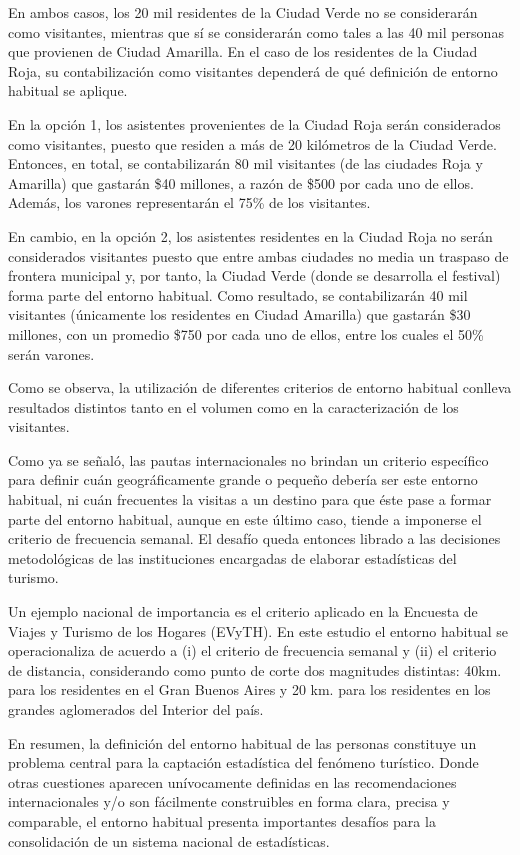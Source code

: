 \documentclass[
]{book}
\begin{document}
En ambos casos, los 20 mil residentes de la Ciudad Verde no se considerarán como visitantes, mientras que sí se considerarán como tales a las 40 mil personas que provienen de Ciudad Amarilla. En el caso de los residentes de la Ciudad Roja, su contabilización como visitantes dependerá de qué definición de entorno habitual se aplique.

En la opción 1, los asistentes provenientes de la Ciudad Roja serán considerados como visitantes, puesto que residen a más de 20 kilómetros de la Ciudad Verde. Entonces, en total, se contabilizarán 80 mil visitantes (de las ciudades Roja y Amarilla) que gastarán \$40 millones, a razón de \$500 por cada uno de ellos. Además, los varones representarán el 75\% de los visitantes.

En cambio, en la opción 2, los asistentes residentes en la Ciudad Roja no serán considerados visitantes puesto que entre ambas ciudades no media un traspaso de frontera municipal y, por tanto, la Ciudad Verde (donde se desarrolla el festival) forma parte del entorno habitual. Como resultado, se contabilizarán 40 mil visitantes (únicamente los residentes en Ciudad Amarilla) que gastarán \$30 millones, con un promedio \$750 por cada uno de ellos, entre los cuales el 50\% serán varones.

Como se observa, la utilización de diferentes criterios de entorno habitual conlleva resultados distintos tanto en el volumen como en la caracterización de los visitantes.

Como ya se señaló, las pautas internacionales no brindan un criterio específico para definir cuán geográficamente grande o pequeño debería ser este entorno habitual, ni cuán frecuentes la visitas a un destino para que éste pase a formar parte del entorno habitual, aunque en este último caso, tiende a imponerse el criterio de frecuencia semanal. El desafío queda entonces librado a las decisiones metodológicas de las instituciones encargadas de elaborar estadísticas del turismo.

Un ejemplo nacional de importancia es el criterio aplicado en la Encuesta de Viajes y Turismo de los Hogares (EVyTH). En este estudio el entorno habitual se operacionaliza de acuerdo a (i) el criterio de frecuencia semanal y (ii) el criterio de distancia, considerando como punto de corte dos magnitudes distintas: 40km. para los residentes en el Gran Buenos Aires y 20 km. para los residentes en los grandes aglomerados del Interior del país.

En resumen, la definición del entorno habitual de las personas constituye un problema central para la captación estadística del fenómeno turístico. Donde otras cuestiones aparecen unívocamente definidas en las recomendaciones internacionales y/o son fácilmente construibles en forma clara, precisa y comparable, el entorno habitual presenta importantes desafíos para la consolidación de un sistema nacional de estadísticas.
\end{document}

